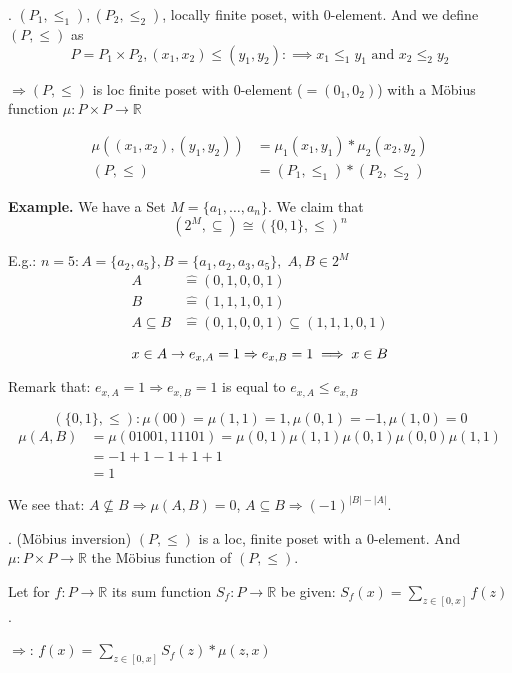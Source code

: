 \Theorem.
$(P_1, \leq_1), (P_2, \leq_2)$, locally finite poset, with 0-element.
And we define $(P, \leq)$ as
\[
  P = P_1 \times P_2, (x_1,x_2) \leq (y_1, y_2) :\implies x_1 \leq_1 y_1 \text{ and } x_2 \leq_2 y_2
\]

$\Rightarrow (P, \leq)$ is loc finite poset with 0-element ($=(0_1, 0_2)$) with a Möbius function $\mu: P\times P \rightarrow \mathbb{R}$

\begin{align*}
  \mu ( (x_1, x_2), (y_1,y_2)) &= \mu_1(x_1,y_1) * \mu_2(x_2,y_2) \\
  (P, \leq) &= (P_1, \leq_1) * (P_2, \leq_2)
\end{align*}

\textbf{Example.}
We have a Set $M = \{a_1, \ldots , a_n\}$. We claim that
\[
  (2^M, \subseteq) \cong ( \{0,1\}, \leq)^n
\]

E.g.: $n = 5: A = \{a_2,a_5\}, B= \{a_1, a_2, a_3, a_5\},\; A, B \in 2^M$
\begin{align*}
  A &\hat{=} (0,1,0,0,1) \\
  B &\hat{=} (1,1,1,0,1) \\
  A \subseteq B &\hat{=} (0,1,0,0,1) \subseteq (1,1,1,0,1) \\
\end{align*}
\[
  x \in A \rightarrow e_{x,A} = 1 \Rightarrow  e_{x,B} = 1 \implies x \in B\\
\]

Remark that: $e_{x,A} = 1 \Rightarrow e_{x,B} = 1$ is equal to $e_{x,A} \leq e_{x,B}$

\[
    ( \{0,1\}, \leq): \mu(00) = \mu(1,1) = 1, \mu(0,1) = -1, \mu(1,0) = 0
\]
\begin{align*}
    \mu(A,B) &= \mu(01001, 11101) = \mu(0,1) \mu(1,1) \mu(0,1) \mu(0,0) \mu(1,1) \\
    &= -1 +1 -1 +1 +1 \\
    &= 1
\end{align*}

We see that:
$A\not\subseteq B \Rightarrow \mu(A,B) = 0$,
$A\subseteq B \Rightarrow (-1)^{|B| - |A|}$.

\Theorem.
(Möbius inversion)
$(P, \leq)$ is a loc, finite poset with a 0-element.
And $\mu: P \times P \rightarrow \mathbb{R}$ the Möbius function of $(P, \leq)$.

Let for $f: P \rightarrow \mathbb{R}$ its sum function $S_f: P \rightarrow \mathbb{R}$ be given: $S_f(x) = \sum_{z \in [0,x]} f(z)$.

$\Rightarrow$: $f(x) = \sum_{z \in [0,x]} S_f(z) * \mu(z,x)$

